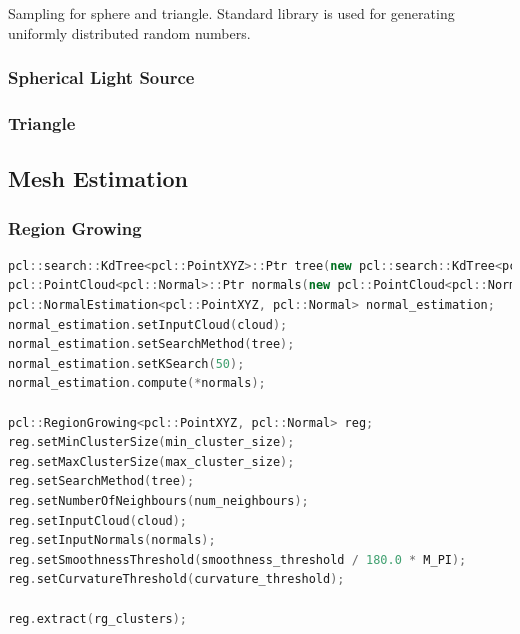 \documentclass[11pt, a4paper,oneside,chapterprefix=false]{scrbook}
\begin{document}
Sampling for sphere and triangle. Standard library is used for generating uniformly distributed random numbers.

\subsubsection{Spherical Light Source}

\subsubsection{Triangle}

\subsection{Mesh Estimation} \label{sec:mesh estimation}

\subsubsection{Region Growing}

\begin{lstlisting}[language=C++, caption=Region Growing]
pcl::search::KdTree<pcl::PointXYZ>::Ptr tree(new pcl::search::KdTree<pcl::PointXYZ>());
pcl::PointCloud<pcl::Normal>::Ptr normals(new pcl::PointCloud<pcl::Normal>);
pcl::NormalEstimation<pcl::PointXYZ, pcl::Normal> normal_estimation;
normal_estimation.setInputCloud(cloud);
normal_estimation.setSearchMethod(tree);
normal_estimation.setKSearch(50);
normal_estimation.compute(*normals);

pcl::RegionGrowing<pcl::PointXYZ, pcl::Normal> reg;
reg.setMinClusterSize(min_cluster_size);
reg.setMaxClusterSize(max_cluster_size);
reg.setSearchMethod(tree);
reg.setNumberOfNeighbours(num_neighbours);
reg.setInputCloud(cloud);
reg.setInputNormals(normals);
reg.setSmoothnessThreshold(smoothness_threshold / 180.0 * M_PI);
reg.setCurvatureThreshold(curvature_threshold);

reg.extract(rg_clusters);
\end{lstlisting}
\end{document}
